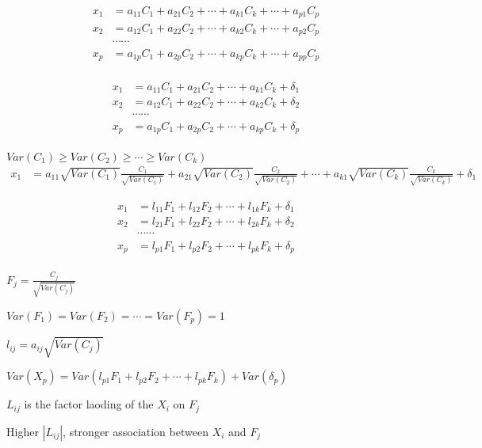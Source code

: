 \begin{align*}
x_1 &= a_{11} C_1 + a_{21}C_2 + \cdots  + a_{k1}C_k + \cdots + a_{p1}C_p \\
x_2 &= a_{12} C_1 + a_{22}C_2 + \cdots  + a_{k2}C_k + \cdots + a_{p2}C_p \\
  & \cdots\cdots \\
x_p &= a_{1p} C_1 + a_{2p}C_2 + \cdots  + a_{kp}C_k + \cdots + a_{pp}C_p \\
\end{align*}

\begin{align*}
x_1 &= a_{11} C_1 + a_{21}C_2 + \cdots  + a_{k1}C_k + \delta_1 \\
x_2 &= a_{12} C_1 + a_{22}C_2 + \cdots  + a_{k2}C_k + \delta_2 \\
  & \cdots\cdots \\
x_p &= a_{1p} C_1 + a_{2p}C_2 + \cdots  + a_{kp}C_k + \delta_p \\
\end{align*}

$Var(C_1) \ge Var(C_2) \ge \cdots \ge Var(C_k)$  
\small
\begin{align*}
x_1 &= a_{11}  \sqrt{Var(C_1)} \frac{C_1}{\sqrt{Var(C_1)} } + a_{21} \sqrt{Var(C_2)} \frac{C_2}{\sqrt{Var(C_2)}} + \cdots  + a_{k1} \sqrt{Var(C_k)} \frac{C_k}{\sqrt{Var(C_k)}} + \delta_1  
\end{align*}

\Large
\begin{align*}
x_1 &= l_{11} F_1 + l_{12} F_2 + \cdots + l_{1k} F_k + \delta_1 \\
x_2 &= l_{21} F_1 + l_{22} F_2 + \cdots + l_{2k} F_k + \delta_2 \\
  & \cdots\cdots \\
x_p &= l_{p1} F_1 + l_{p2} F_2 + \cdots + l_{pk} F_k + \delta_p \\
\end{align*}

$F_{j} = \frac{C_j}{\sqrt{Var(C_j)}}$

$Var(F_1) = Var(F_2) = \cdots = Var(F_p) =1$  

$l_{ij} = a_{ij} \sqrt{Var(C_j)}$

$Var(X_p) = Var(l_{p1} F_1 + l_{p2} F_2 + \cdots + l_{pk} F_k) + Var(\delta_p)$

$L_{ij}$ is the factor laoding of the $X_i$ on $F_j$ 

Higher $|L_{ij}|$, stronger association between $X_i$ and $F_j$

\begin{equation*}
\end{equation*}

